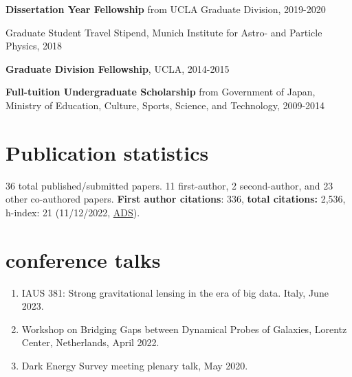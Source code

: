 \documentclass[margin, line]{res}
\begin{document}
\begin{resume}
\vspace*{-2.5mm}
\textbf{Dissertation Year Fellowship} from UCLA Graduate Division, 2019-2020%

\vspace*{-2.5mm}
Graduate Student Travel Stipend, {Munich Institute for Astro- and Particle Physics}, 2018%


\vspace*{-2.5mm}
\textbf{Graduate Division Fellowship}, UCLA, 2014-2015%

\vspace*{-2.5mm}
\textbf{Full-tuition Undergraduate Scholarship} from {Government of Japan, Ministry of Education, Culture, Sports, Science, and Technology}, 2009-2014%

\section{\sc Publication statistics} 36 total published/submitted papers. {11 first-author}, {2 second-author, and 23 other co-authored} papers. \textbf{First author citations}: 336, \textbf{total citations:} 2,536, h-index: 21 (11/12/2022, \href{https://ui.adsabs.harvard.edu/user/libraries/NYgiA71JS4CR85Tt8CgJsw}{ADS}).
\vspace*{2.5mm}

\section{ conference talks}
\begin{enumerate}
	\item IAUS 381: Strong gravitational lensing in the era of big data. Italy, June 2023.
	\item Workshop on Bridging Gaps between Dynamical Probes of Galaxies, Lorentz Center, Netherlands, April 2022.
	\item Dark Energy Survey meeting plenary talk, May 2020.	 %
\end{enumerate}


\end{resume}
\end{document}
